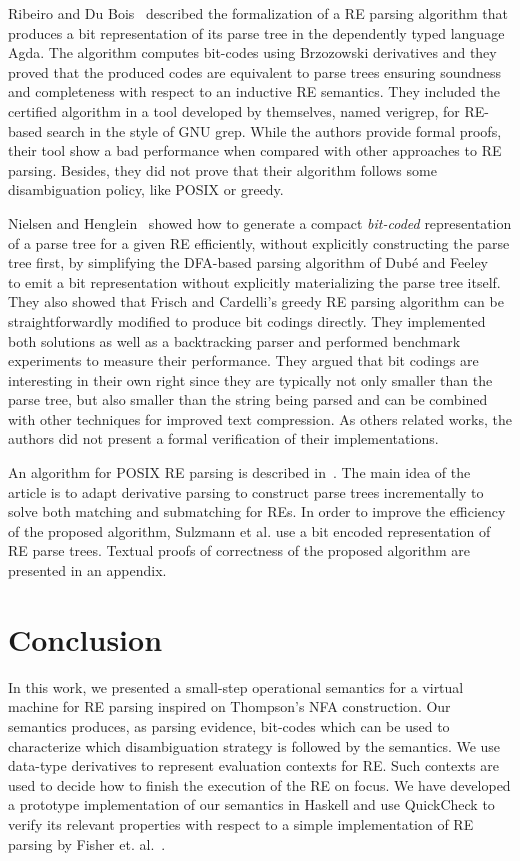 \documentclass[sigplan]{acmart}
\theoremstyle{definition}
\begin{document}
Ribeiro and Du Bois~\cite{Ribeiro2017} described the formalization of a RE parsing algorithm that produces a bit representation
of its parse tree in the dependently typed language Agda. The algorithm computes bit-codes using Brzozowski derivatives and
they proved that the produced codes are equivalent to parse trees ensuring soundness and completeness with respect to an
inductive RE semantics. They included the certified algorithm in a tool developed by themselves, named verigrep, for RE-based
search in the style of GNU grep. While the authors provide formal proofs, their tool show a bad performance when compared with
other approaches to RE parsing. Besides, they did not prove that their algorithm follows some disambiguation policy, like POSIX
or greedy.

Nielsen and Henglein~\cite{Lasse2011} showed how to generate a compact \textit{bit-coded} representation of a parse tree for a
given RE efficiently, without explicitly constructing the parse tree first, by simplifying the DFA-based parsing algorithm of
Dub\'e and Feeley~\cite{Dube2000} to emit a bit representation without explicitly materializing the parse tree itself.
They also showed that Frisch and Cardelli's greedy RE parsing algorithm \cite{Frisch2004} can be straightforwardly modified to
produce bit codings directly. They implemented both solutions as well as a backtracking parser and performed benchmark experiments
to measure their performance. They argued that bit codings are interesting in their own right since they are typically not
only smaller than the parse tree, but also smaller than the string being parsed and can be combined with other techniques for
improved text compression. As others related works, the authors did not present a formal verification of their implementations.

An algorithm for POSIX RE parsing is described in~\cite{Sulzmann14}. The main idea of the article is to adapt
derivative parsing to construct parse trees incrementally to solve both matching and submatching for REs. In order to improve the
efficiency of the proposed algorithm, Sulzmann et al. use a bit encoded representation of RE parse trees. Textual proofs of
correctness of the proposed algorithm are presented in an appendix.

\section{Conclusion}\label{section:conclusion}

In this work, we presented a small-step operational semantics for a virtual machine for RE parsing inspired on
Thompson's NFA construction. Our semantics produces, as parsing evidence, bit-codes which can be used to characterize which
disambiguation strategy is followed by the semantics. We use data-type derivatives to represent evaluation contexts for RE.
Such contexts are used to decide how to finish the execution of the RE on focus. We have developed a prototype implementation
of our semantics in Haskell and use QuickCheck to verify its relevant properties with respect to a simple implementation
of RE parsing by Fisher et. al.~\cite{Fischer2010}.
\end{document}
